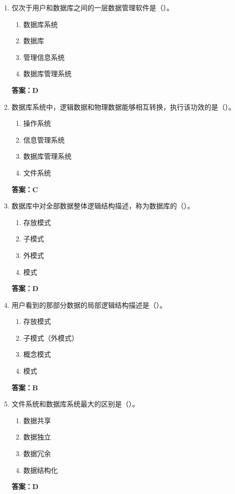 \documentclass[12pt, a4paper]{article}
\begin{document}
\begin{enumerate}[label=\arabic*.]
	\item 仅次于用户和数据库之间的一层数据管理软件是（\quad）。
	      \begin{enumerate}
		      \item 数据库系统
		      \item 数据库
		      \item 管理信息系统
		      \item 数据库管理系统
	      \end{enumerate}
	      \textbf{答案：D}

	\item 数据库系统中，逻辑数据和物理数据能够相互转换，执行该功效的是（\quad）。
	      \begin{enumerate}
		      \item 操作系统
		      \item 信息管理系统
		      \item 数据库管理系统
		      \item 文件系统
	      \end{enumerate}
	      \textbf{答案：C}

	\item 数据库中对全部数据整体逻辑结构描述，称为数据库的（\quad）。
	      \begin{enumerate}
		      \item 存放模式
		      \item 子模式
		      \item 外模式
		      \item 模式
	      \end{enumerate}
	      \textbf{答案：D}

	\item 用户看到的那部分数据的局部逻辑结构描述是（\quad）。
	      \begin{enumerate}
		      \item 存放模式
		      \item 子模式（外模式）
		      \item 概念模式
		      \item 模式
	      \end{enumerate}
	      \textbf{答案：B}

	\item 文件系统和数据库系统最大的区别是（\quad）。
	      \begin{enumerate}
		      \item 数据共享
		      \item 数据独立
		      \item 数据冗余
		      \item 数据结构化
	      \end{enumerate}
	      \textbf{答案：D}


\end{enumerate}
\end{document}
